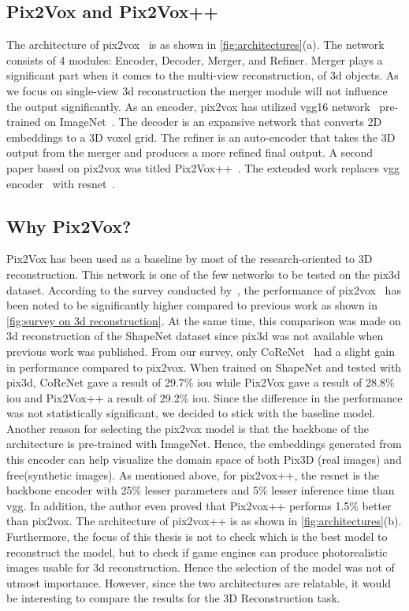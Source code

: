 \subsection{Pix2Vox and Pix2Vox++}\label{subsec:pix2vox-and-pix2vox++}
The architecture of pix2vox~\cite{Xie_2019} is as shown in \autoref{fig:architectures}(a).
The network consists of 4 modules: Encoder, Decoder, Merger, and Refiner.
Merger plays a significant part when it comes to the multi-view reconstruction, of 3d objects.
As we focus on single-view 3d reconstruction the merger module will not influence the output significantly.
As an encoder, pix2vox has utilized \gls{vgg}16 network~\cite{simonyan2015deep} pre-trained on ImageNet~\cite{Deng2009ImageNetAL}.
The decoder is an expansive network that converts 2D embeddings to a 3D voxel grid.
The refiner is an auto-encoder that takes the 3D output from the merger and produces a more refined final output.
A second paper based on pix2vox was titled Pix2Vox++~\cite{Xie_2020}.
The extended work replaces \gls{vgg} encoder~\cite{simonyan2015deep} with \gls{resnet}~\cite{He2016DeepRL}.

\subsection{Why Pix2Vox?}\label{subsec:why-pix2vox?}
Pix2Vox has been used as a baseline by most of the research-oriented to 3D reconstruction.
This network is one of the few networks to be tested on the pix3d dataset.
According to the survey conducted by~\cite{Han2021ImageBased3O}, the performance of pix2vox~\cite{Xie_2019}
has been noted to be significantly higher compared to previous work  as shown in \autoref{fig:survey on 3d reconstruction}.
At the same time, this comparison was made on 3d reconstruction of the ShapeNet dataset since pix3d was not available when previous work was published.
From our survey, only CoReNet~\cite{popov2020corenet} had a slight gain in performance compared to pix2vox.
When trained on ShapeNet and tested with pix3d, CoReNet gave a result of 29.7\% \gls{iou} while Pix2Vox gave a result of 28.8\% \gls{iou}  and Pix2Vox++ a result of 29.2\% \gls{iou}\@.
Since the difference in the performance was not statistically significant, we decided to stick with the baseline model.
Another reason for selecting the pix2vox model is that the backbone of the architecture is pre-trained with ImageNet.
Hence, the embeddings generated from this encoder can help visualize the domain space of both Pix3D (real images)  and \gls{free}(synthetic images).
As mentioned above, for pix2vox++, the \gls{resnet} is the backbone encoder with 25\% lesser parameters and 5\% lesser inference time than \gls{vgg}\@.
In addition, the author even proved that Pix2vox++ performs 1.5\% better than pix2vox.
The architecture of pix2vox++ is as shown in \autoref{fig:architectures}(b).
Furthermore, the focus of this thesis is not to check which is the best model to reconstruct the model, but to check if game engines can produce photorealistic images usable for 3d reconstruction.
Hence the selection of the model was not of utmost importance.
However, since the two architectures are relatable, it would be interesting to compare the results for the 3D Reconstruction task.

